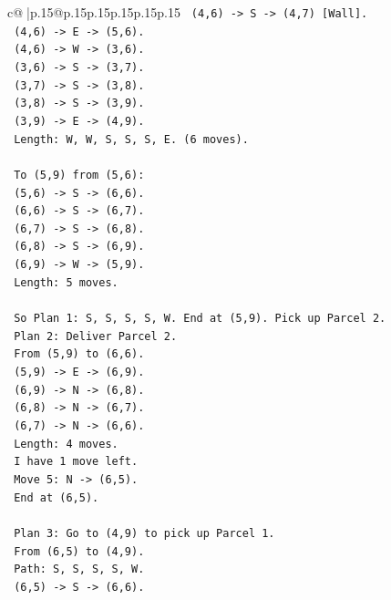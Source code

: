 \documentclass{article}
\begin{document}
{\begin{supertabular}{c@{$\;$}|p{.15\linewidth}@{}p{.15\linewidth}p{.15\linewidth}p{.15\linewidth}p{.15\linewidth}p{.15\linewidth}}
{{{\texttt{      (4,6) {-}> S {-}> (4,7) {[}Wall{]}.} \\
\texttt{      (4,6) {-}> E {-}> (5,6).} \\
\texttt{      (4,6) {-}> W {-}> (3,6).} \\
\texttt{      (3,6) {-}> S {-}> (3,7).} \\
\texttt{      (3,7) {-}> S {-}> (3,8).} \\
\texttt{      (3,8) {-}> S {-}> (3,9).} \\
\texttt{      (3,9) {-}> E {-}> (4,9).} \\
\texttt{      Length: W, W, S, S, S, E. (6 moves).} \\
\\ 
\texttt{      To (5,9) from (5,6):} \\
\texttt{      (5,6) {-}> S {-}> (6,6).} \\
\texttt{      (6,6) {-}> S {-}> (6,7).} \\
\texttt{      (6,7) {-}> S {-}> (6,8).} \\
\texttt{      (6,8) {-}> S {-}> (6,9).} \\
\texttt{      (6,9) {-}> W {-}> (5,9).} \\
\texttt{      Length: 5 moves.} \\
\\ 
\texttt{      So Plan 1: S, S, S, S, W. End at (5,9). Pick up Parcel 2.} \\
\texttt{      Plan 2: Deliver Parcel 2.} \\
\texttt{      From (5,9) to (6,6).} \\
\texttt{      (5,9) {-}> E {-}> (6,9).} \\
\texttt{      (6,9) {-}> N {-}> (6,8).} \\
\texttt{      (6,8) {-}> N {-}> (6,7).} \\
\texttt{      (6,7) {-}> N {-}> (6,6).} \\
\texttt{      Length: 4 moves.} \\
\texttt{      I have 1 move left.} \\
\texttt{      Move 5: N {-}> (6,5).} \\
\texttt{      End at (6,5).} \\
\\ 
\texttt{      Plan 3: Go to (4,9) to pick up Parcel 1.} \\
\texttt{      From (6,5) to (4,9).} \\
\texttt{      Path: S, S, S, S, W.} \\
\texttt{      (6,5) {-}> S {-}> (6,6).} \\
}}}
\end{supertabular}}
\end{document}
